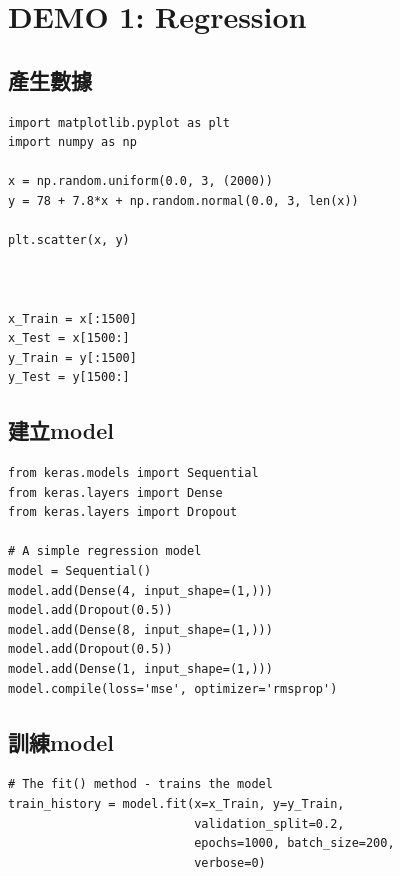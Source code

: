 \documentclass[a4paper,12pt]{article}
\begin{document}
\newpage

\section{DEMO 1: Regression}
\label{sec:orgd162b59}
\subsection{產生數據}
\label{sec:orga951e37}
\lstset{breaklines=true,language=Python,label= ,caption= ,captionpos=b,numbers=none}
\begin{lstlisting}
import matplotlib.pyplot as plt
import numpy as np

x = np.random.uniform(0.0, 3, (2000))
y = 78 + 7.8*x + np.random.normal(0.0, 3, len(x))

plt.scatter(x, y)



x_Train = x[:1500]
x_Test = x[1500:]
y_Train = y[:1500]
y_Test = y[1500:]

\end{lstlisting}

\subsection{建立model}
\label{sec:org0c004fd}
\lstset{breaklines=true,language=Python,label= ,caption= ,captionpos=b,numbers=none}
\begin{lstlisting}
from keras.models import Sequential
from keras.layers import Dense
from keras.layers import Dropout

# A simple regression model
model = Sequential()
model.add(Dense(4, input_shape=(1,)))
model.add(Dropout(0.5))
model.add(Dense(8, input_shape=(1,)))
model.add(Dropout(0.5))
model.add(Dense(1, input_shape=(1,)))
model.compile(loss='mse', optimizer='rmsprop')
\end{lstlisting}

\subsection{訓練model}
\label{sec:org81c7859}
\lstset{breaklines=true,language=Python,label= ,caption= ,captionpos=b,numbers=none}
\begin{lstlisting}
# The fit() method - trains the model
train_history = model.fit(x=x_Train, y=y_Train,
                          validation_split=0.2,
                          epochs=1000, batch_size=200,
                          verbose=0)

\end{lstlisting}
\end{document}
